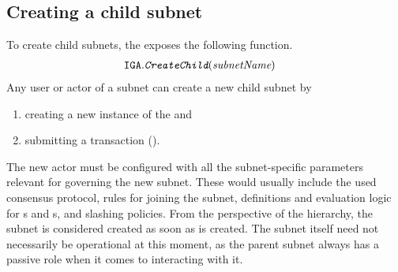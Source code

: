 \subsection{Creating a child subnet}
\label{sec:create}

To create child subnets, the \gw exposes the following function.
\begin{align*}
    \texttt{IGA}.&\textit{\texttt{CreateChild}}(\textit{subnetName})
\end{align*}
Any user or actor of a subnet  can create a new child subnet  by
\begin{enumerate}
    \item creating a new instance of the \saFull {} and
    \item submitting a transaction ().
\end{enumerate}

The new actor  must be configured with all the subnet-specific parameters relevant for governing the new subnet.
These would usually include the used consensus protocol, rules for joining the subnet, definitions and evaluation logic for {\pom}s and {\pof}s, and slashing policies.
From the perspective of the \ipc hierarchy, the subnet is considered created as soon as  is created.
The subnet itself need not necessarily be operational at this moment,
as the parent subnet always has a passive role when it comes to interacting with it.

